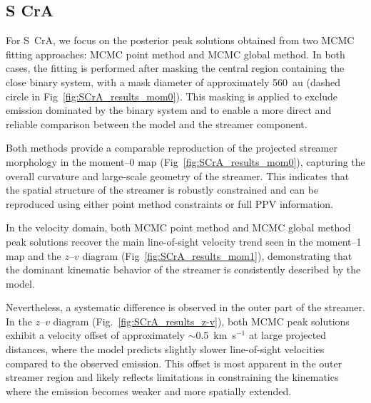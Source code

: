 \subsection{S CrA}
For S~CrA, we focus on the posterior peak solutions obtained from two MCMC fitting approaches: MCMC point method and MCMC global method. In both cases, the fitting is performed after masking the central region containing the close binary system, with a mask diameter of approximately 560~au (dashed circle in Fig~\ref{fig:SCrA_results_mom0}). This masking is applied to exclude emission dominated by the binary system and to enable a more direct and reliable comparison between the model and the streamer component.

Both methods provide a comparable reproduction of the projected streamer morphology in the moment--0 map (Fig~\ref{fig:SCrA_results_mom0}), capturing the overall curvature and large-scale geometry of the streamer. This indicates that the spatial structure of the streamer is robustly constrained and can be reproduced using either point method constraints or full PPV information.

In the velocity domain, both MCMC point method and MCMC global method peak solutions recover the main line-of-sight velocity trend seen in the moment--1 map and the $z$--$v$ diagram (Fig~\ref{fig:SCrA_results_mom1}), demonstrating that the dominant kinematic behavior of the streamer is consistently described by the model. 

Nevertheless, a systematic difference is observed in the outer part of the streamer. In the $z$--$v$ diagram (Fig.~\ref{fig:SCrA_results_z-v}), both MCMC peak solutions exhibit a velocity offset of approximately $\sim$0.5~km~s$^{-1}$ at large projected distances, where the model predicts slightly slower line-of-sight velocities compared to the observed emission. This offset is most apparent in the outer streamer region and likely reflects limitations in constraining the kinematics where the emission becomes weaker and more spatially extended.

